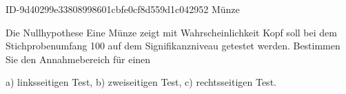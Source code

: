 \begin{exercise}
      {ID-9d40299e33808998601cbfe0cf8d559d1c042952}
      {Münze}
  \ifproblem\problem\par
    Die Nullhypothese \glqq Eine Münze zeigt mit  Wahrscheinlichkeit
    Kopf\grqq{} soll bei dem Stichprobenumfang 100 auf dem Signifikanzniveau
     getestet werden. Bestimmen Sie den Annahmebereich für einen
    \begin{center}
      a) linksseitigen Test,
      \qquad
      b) zweiseitigen Test,
      \qquad
      c) rechtsseitigen Test.
    \end{center}
  \fi
\end{exercise}
